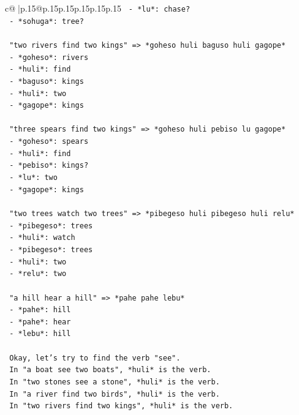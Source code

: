 \documentclass{article}
\begin{document}
{\begin{supertabular}{c@{$\;$}|p{.15\linewidth}@{}p{.15\linewidth}p{.15\linewidth}p{.15\linewidth}p{.15\linewidth}p{.15\linewidth}}
{{{\texttt{   {-} *lu*: chase?} \\
\texttt{   {-} *sohuga*: tree?} \\
\\ 
\texttt{   "two rivers find two kings" => *goheso huli baguso huli gagope*} \\
\texttt{   {-} *goheso*: rivers} \\
\texttt{   {-} *huli*: find} \\
\texttt{   {-} *baguso*: kings} \\
\texttt{   {-} *huli*: two} \\
\texttt{   {-} *gagope*: kings} \\
\\ 
\texttt{   "three spears find two kings" => *goheso huli pebiso lu gagope*} \\
\texttt{   {-} *goheso*: spears} \\
\texttt{   {-} *huli*: find} \\
\texttt{   {-} *pebiso*: kings?} \\
\texttt{   {-} *lu*: two} \\
\texttt{   {-} *gagope*: kings} \\
\\ 
\texttt{   "two trees watch two trees" => *pibegeso huli pibegeso huli relu*} \\
\texttt{   {-} *pibegeso*: trees} \\
\texttt{   {-} *huli*: watch} \\
\texttt{   {-} *pibegeso*: trees} \\
\texttt{   {-} *huli*: two} \\
\texttt{   {-} *relu*: two} \\
\\ 
\texttt{   "a hill hear a hill" => *pahe pahe lebu*} \\
\texttt{   {-} *pahe*: hill} \\
\texttt{   {-} *pahe*: hear} \\
\texttt{   {-} *lebu*: hill} \\
\\ 
\texttt{   Okay, let's try to find the verb "see".} \\
\texttt{   In "a boat see two boats", *huli* is the verb.} \\
\texttt{   In "two stones see a stone", *huli* is the verb.} \\
\texttt{   In "a river find two birds", *huli* is the verb.} \\
\texttt{   In "two rivers find two kings", *huli* is the verb.} \\
}}}
\end{supertabular}}
\end{document}

